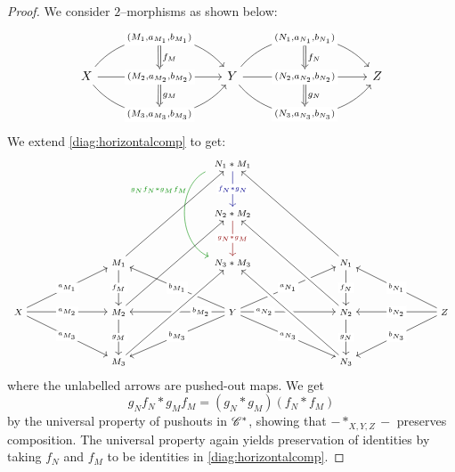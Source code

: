 \documentclass[./Thick_TQFTs_and_Quantum_Information.tex]{subfiles}
\begin{document}
\begin{proof}
We consider $2$--morphisms as shown below:
\begin{equation}
\begin{tikzcd}[column sep=100]
  X \arrow[r, bend left=50,
          "{(M_1, a_{M_1}, b_{M_1})}"{name=M1, description}]
    \arrow[r, "{(M_2, a_{M_2}, b_{M_2})}"{name=M2, description}]
    \arrow[r, bend right=50,
          "{(M_3, a_{M_3}, b_{M_3})}"{name=M3, description}] &
  Y \arrow[r, bend left=50,
          "{(N_1, a_{N_1}, b_{N_1})}"{name=N1, description}]
    \arrow[r, "{(N_2, a_{N_2}, b_{N_2})}"{name=N2, description}]
    \arrow[r, bend right=50,
          "{(N_3, a_{N_3}, b_{N_3})}"{name=N3, description}] &
  Z
  \arrow[Rightarrow, from=M1, to=M2, "f_M"]
  \arrow[Rightarrow, from=M2, to=M3, "g_M"]
  \arrow[Rightarrow, from=N1, to=N2, "f_N"]
  \arrow[Rightarrow, from=N2, to=N3, "g_N"]
\end{tikzcd}
\end{equation}
We extend \eqref{diag:horizontalcomp} to get:
\begin{equation}
\begin{scriptsize}
\begin{tikzcd}[column sep=65, row sep=huge]
& &
N_1 * M_1 \arrow[d, "f_N * g_N" description, blue!55!black]
          \arrow[dd, bend right=65, shift right=5, green!55!black,
                "g_Nf_N * g_Mf_M" left, near start] & & \\ & &
N_2 * M_2 \arrow[d, "g_N * g_M" description, red!55!black] & & \\ &
M_1 \arrow[ruu] \arrow[d, "f_M" description] &
N_3 * M_3 &
N_1 \arrow[luu] \arrow[d, "f_N" description] & \\
X \arrow[ru, "a_{M_1}" description]
  \arrow[r, "a_{M_2}" description]
  \arrow[rd, "a_{M_3}" description] &
M_2 \arrow[ruu] \arrow[d, "g_M" description] &
Y \arrow[ru, "a_{N_1}" description]
  \arrow[r, "a_{N_2}"  description, near start]
  \arrow[rd, "a_{N_3}" description]
  \arrow[lu, "b_{M_1}" description]
  \arrow[l, "b_{M_2}"  description, near start]
  \arrow[ld, "b_{M_3}" description] &
N_2 \arrow[luu, crossing over] \arrow[d, "g_N" description] &
Z \arrow[lu, "b_{N_1}" description]
  \arrow[l, "b_{N_2}"  description]
  \arrow[ld, "b_{N_3}" description] \\
& M_3 \arrow[ruu, crossing over] & & N_3 \arrow[luu, crossing over] &
\end{tikzcd}
\end{scriptsize}
\end{equation}
where the unlabelled arrows are pushed-out maps. We get
\[
  g_Nf_N * g_Mf_M = (g_N * g_M)(f_N * f_M)
\]
by the universal property of pushouts in $\mathscr{C}^*$, showing that
$- *_{X, Y, Z} -$ preserves composition. The universal property again yields
preservation of identities by taking $f_N$ and $f_M$ to be identities in
\eqref{diag:horizontalcomp}.
\end{proof}
\end{document}
